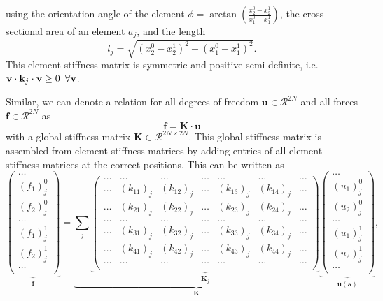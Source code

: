 using the orientation angle of the element $\phi = \arctan\left(\frac{x^0_2-x^1_2}{x^0_1-x^1_1}\right)$, the cross sectional area of an element $a_j$, and the length 
\begin{equation}
    l_j = \sqrt{(x^0_2-x^1_2)^2 + (x^0_1-x^1_1)^2}.
\end{equation}
This element stiffness matrix is symmetric and positive semi-definite, i.e. $\mathbf{v} \cdot \mathbf{k}_j \cdot \mathbf{v} \ge 0 \hspace{0.5em} \forall \mathbf{v}$. 

Similar, we can denote a relation for all degrees of freedom $\mathbf{u} \in \mathcal{R}^{2N}$ and all forces $\mathbf{f} \in \mathcal{R}^{2N}$ as 
\begin{equation}
    \mathbf{f} = \mathbf{K} \cdot  \mathbf{u} 
    \label{eq:global_stiffness}
\end{equation}
with a global stiffness matrix $\mathbf{K} \in \mathcal{R}^{2N \times 2N}$. This global stiffness matrix is assembled from element stiffness matrices by adding entries of all element stiffness matrices at the correct positions. This can be written as 
\begin{equation}
    \underbrace{
    \begin{pmatrix}
        \dots \\ (f_1)^0_j \\ (f_2)^0_j \\ \dots \\ (f_1)^1_j \\ (f_2)^1_j \\ \dots \\
    \end{pmatrix}}_{\mathbf{f}}
    =
    \underbrace{
    \sum_j
    \underbrace{
    \begin{pmatrix}
    \dots & \dots & \dots & \dots & \dots & \dots & \dots \\
    \dots & (k_{11})_j & (k_{12})_j & \dots & (k_{13})_j & (k_{14})_j & \dots  \\
    \dots & (k_{21})_j & (k_{22})_j & \dots & (k_{23})_j & (k_{24})_j & \dots  \\
    \dots & \dots & \dots & \dots & \dots & \dots & \dots  \\
    \dots & (k_{31})_j & (k_{32})_j & \dots & (k_{33})_j & (k_{34})_j & \dots  \\
    \dots & (k_{41})_j & (k_{42})_j & \dots & (k_{43})_j & (k_{44})_j & \dots  \\
    \dots & \dots & \dots & \dots & \dots & \dots & \dots  \\
    \end{pmatrix}}_{\mathbf{K}_j}
    }_{\mathbf{K}}
    \underbrace{
    \begin{pmatrix}
        \dots \\ (u_1)^0_j \\ (u_2)^0_j \\ \dots \\ (u_1)^1_j \\ (u_2)^1_j \\ \dots \\
    \end{pmatrix}}_{\mathbf{u} (\mathbf{a})},
\end{equation}
